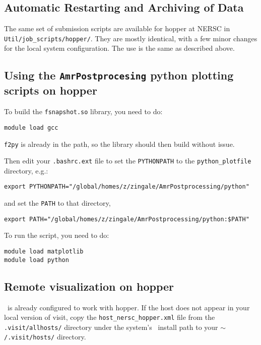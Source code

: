 \subsection{Automatic Restarting and Archiving of Data}

The same set of submission scripts are available for hopper at NERSC in 
{\tt Util/job\_scripts/hopper/}.  They are mostly identical, with a few
minor changes for the local system configuration.  The use is the same
as described above.

\subsection{Using the {\tt AmrPostprocesing} python plotting scripts on hopper}

To build the {\tt fsnapshot.so} library, you need to do:
\begin{verbatim}
module load gcc
\end{verbatim}
{\tt f2py} is already in the path, so the library should then build without issue.
%

Then edit your {\tt .bashrc.ext} file to set the {\tt PYTHONPATH} to
the {\tt python\_plotfile} directory, e.g.:
\begin{verbatim}
export PYTHONPATH="/global/homes/z/zingale/AmrPostprocessing/python"
\end{verbatim}
%
and set the {\tt PATH} to that directory,
\begin{verbatim}
export PATH="/global/homes/z/zingale/AmrPostprocessing/python:$PATH"
\end{verbatim}

To run the script, you need to do:
\begin{verbatim}
module load matplotlib
module load python
\end{verbatim}



\subsection{Remote visualization on hopper}

\visit\ is already configured to work with hopper.  If the host does not appear
in your local version of visit, copy the {\tt host\_nersc\_hopper.xml} file
from the {\tt .visit/allhosts/} directory under the system's \visit\ install path
to your {\tt $\mathtt{\sim}$/.visit/hosts/} directory. 
